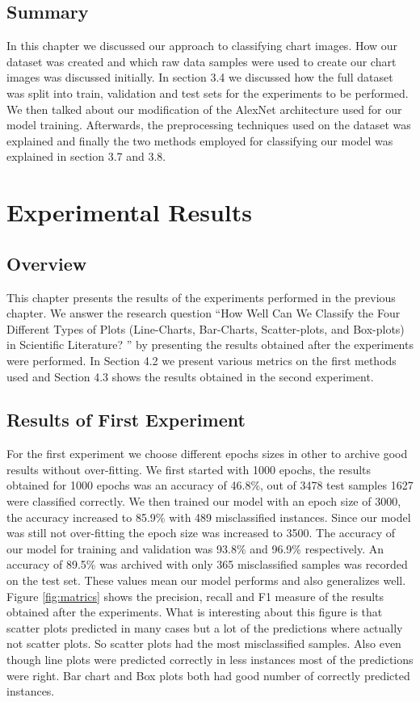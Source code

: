 \documentclass[12pt, a4paper,oneside]{report}
\begin{document}
\section{Summary}
In this chapter we discussed our approach to classifying chart images. How our dataset was created and which raw data samples were used to create our chart images was discussed initially. In section 3.4 we discussed how the full dataset was split into train, validation and test sets for the experiments to be performed. We then talked about our modification of the AlexNet architecture used for our model training. Afterwards, the preprocessing techniques used on the dataset was explained and finally the two methods employed for classifying our model was explained in section 3.7 and 3.8.


\chapter{Experimental Results}

 \section{Overview}
This chapter presents the results of the experiments performed in the previous chapter. We answer the research question
``How Well Can We Classify the Four Different Types of Plots (Line-Charts, Bar-Charts, Scatter-plots, and Box-plots) in Scientific Literature? '' by presenting the results obtained after the experiments were performed. In Section 4.2 we present various metrics on the first methods used and Section 4.3 shows the results obtained in the second experiment.

\section{Results of First Experiment}
For the first experiment we choose different epochs sizes in other to archive good results without over-fitting. We first started with 1000 epochs, the results obtained for 1000 epochs was an accuracy of 46.8\%, out of 3478 test samples 1627 were classified correctly. We then trained our model with an epoch size of 3000, the accuracy increased to 85.9\% with 489 misclassified instances. Since our model was still not over-fitting the epoch size was increased to 3500. The accuracy of our model for training and validation was 93.8\% and 96.9\% respectively. An accuracy of 89.5\% was archived with only 365 misclassified samples was recorded on the test set. These values mean our model performs and also generalizes well.
Figure \ref{fig:matrics} shows the precision, recall and F1 measure of the results obtained after the experiments. What is interesting about this figure is that scatter plots predicted in many cases but a lot of the predictions where actually not scatter plots. So scatter plots had the most misclassified samples. Also even though line plots were predicted correctly in less instances most of the predictions were right. Bar chart and Box plots both had good number of correctly predicted instances.
\end{document}
